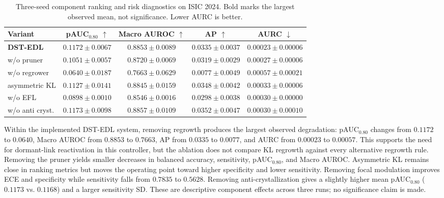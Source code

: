 \documentclass[letterpaper]{article}
\begin{document}
\begin{table}[!t]
\centering
\caption{Three-seed component ranking and risk diagnostics on ISIC 2024. Bold marks the largest observed mean, not significance. Lower AURC is better.}
\label{tab:ablation_ranking}
\scriptsize
\renewcommand{\arraystretch}{1.05}
\setlength{\tabcolsep}{1.8pt}
\begin{adjustbox}{max width=\columnwidth}
\begin{tabular}{@{}l C C C C@{}}
\toprule
\textbf{Variant} & \textbf{pAUC$_{0.80}$} $\uparrow$ & \textbf{Macro AUROC} $\uparrow$ & \textbf{AP} $\uparrow$ & \textbf{AURC} $\downarrow$ \\
\midrule
\textbf{DST-EDL} & $0.1172\pm0.0067$ & $0.8853\pm0.0089$ & $0.0335\pm0.0037$ & $\mathbf{0.00023\pm0.00006}$ \\
w/o pruner & $0.1051\pm0.0057$ & $0.8720\pm0.0069$ & $0.0319\pm0.0029$ & $0.00027\pm0.00006$ \\
w/o regrower & $0.0640\pm0.0187$ & $0.7663\pm0.0629$ & $0.0077\pm0.0049$ & $0.00057\pm0.00021$ \\
asymmetric KL & $0.1127\pm0.0141$ & $0.8845\pm0.0159$ & $0.0348\pm0.0042$ & $0.00033\pm0.00006$ \\
w/o EFL & $0.0898\pm0.0010$ & $0.8546\pm0.0016$ & $0.0298\pm0.0038$ & $0.00030\pm0.00000$ \\
w/o anti cryst. & $\mathbf{0.1173\pm0.0098}$ & $\mathbf{0.8857\pm0.0109}$ & $\mathbf{0.0352\pm0.0047}$ & $0.00030\pm0.00010$ \\
\bottomrule
\end{tabular}
\end{adjustbox}
\end{table}

Within the implemented DST-EDL system, removing regrowth produces the largest
observed degradation: pAUC$_{0.80}$ changes from $0.1172$ to $0.0640$, Macro
AUROC from $0.8853$ to $0.7663$, AP from $0.0335$ to $0.0077$, and AURC
from $0.00023$ to $0.00057$. This supports the need for dormant-link
reactivation in this controller, but the ablation does not compare KL regrowth
against every alternative regrowth rule. Removing the pruner yields smaller
decreases in balanced accuracy, sensitivity, pAUC$_{0.80}$, and Macro AUROC.
Asymmetric KL remains close in ranking metrics but moves the operating point
toward higher specificity and lower sensitivity. Removing focal modulation
improves ECE and specificity while sensitivity falls from $0.7835$ to $0.5628$.
Removing anti-crystallization gives a slightly higher mean pAUC$_{0.80}$
($0.1173$ vs. $0.1168$) and a larger sensitivity SD. These are descriptive
component effects across three runs; no significance claim is made.
\end{document}
